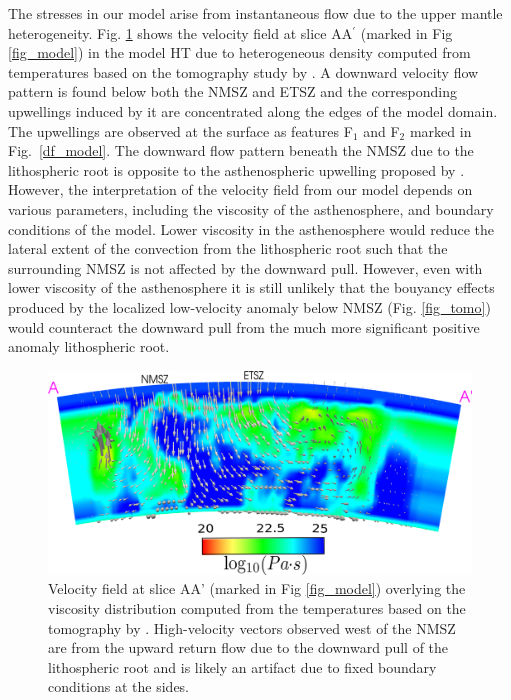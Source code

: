 \documentclass[draft,linenumbers]{agujournal2018}
\begin{document}
%    

    The stresses in our model arise from instantaneous flow due to the upper mantle heterogeneity. Fig. \ref{velocity_pattern} shows the velocity field at slice AA$^{\prime}$ (marked in Fig \ref{fig_model}) in the model HT due to heterogeneous density computed from temperatures based on the tomography study by \citet{Biryol_2016}. A downward velocity flow pattern is found below both the NMSZ and ETSZ and the corresponding upwellings induced by it are concentrated along the edges of the model domain. The upwellings are observed at the surface as features F$_1$ and F$_2$ marked in Fig.~\ref{df_model}. The downward flow pattern beneath the NMSZ due to the lithospheric root is opposite to the asthenospheric upwelling proposed by \citet{Biryol_2016}. However, the interpretation of the velocity field from our model depends on various parameters, including the viscosity of the asthenosphere, and boundary conditions of the model. %
    Lower viscosity in the asthenosphere would reduce the lateral extent of the convection from the lithospheric root such that the surrounding NMSZ is not affected by the downward pull. However, even with lower viscosity of the asthenosphere it is still unlikely that the bouyancy effects produced by the localized low-velocity anomaly below NMSZ (Fig. \ref{fig_tomo}) would counteract the downward pull from the much more significant positive anomaly lithospheric root. 
%    
\begin{figure}[ht]
    \centering
    \includegraphics[width=0.9\linewidth]{figures/velocity_pattern.png}
    \caption{Velocity field at slice AA' (marked in Fig \ref{fig_model}) overlying the viscosity distribution computed from the temperatures based on the tomography by \citet{Biryol_2016}. High-velocity vectors observed west of the NMSZ are from the upward return flow due to the downward pull of the lithospheric root and is likely an artifact due to fixed boundary conditions at the sides.}
    \label{velocity_pattern}
\end{figure}    
\end{document}
